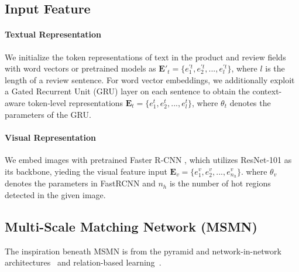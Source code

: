 \subsection{Input Feature}
\paragraph{Textual Representation}
We initialize the token representations of text in the product and review fields with word vectors or pretrained models as
$\mathbf{E'}_t = \{e_1^{'t}, e_2^{'t}, ..., e_l^{'t}\} $, where $l$ is the length of a review sentence. 
For word vector embeddings, we additionally exploit a Gated Recurrent Unit (GRU) \citep{cho2014learning} layer on each sentence to obtain the context-aware token-level representations $\mathbf{E}_t= \{e_1^t, e_2^t, ..., e_l^t\}$,
where $\theta_t$ denotes the parameters of the GRU.

\paragraph{Visual Representation} 
We embed images with pretrained Faster R-CNN \citep{ren2015faster}, which utilizes ResNet-101 as its backbone, yieding the visual feature input $\mathbf{E}_v=\{e_1^v,e_2^v,...,e_{n_h}^v\}$.
where $\theta_v$ denotes the parameters in FastRCNN and $n_h$ is the number of hot regions detected in the given image.


\subsection{Multi-Scale Matching Network (MSMN)}
The inspiration beneath MSMN is from the pyramid and network-in-network architectures~\cite{lazebnik2006beyond,han2021transformer} and relation-based learning~\citep{snell2017prototypical, sung2018learning}.
